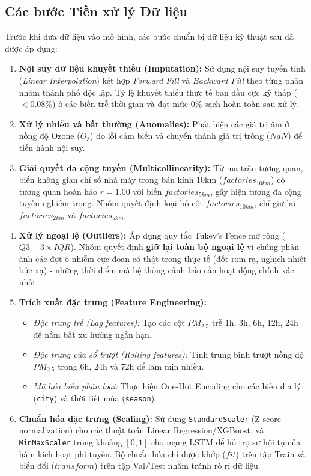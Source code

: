 \documentclass[12pt,a4paper]{article}
\begin{document}
\subsection{Các bước Tiền xử lý Dữ liệu}

Trước khi đưa dữ liệu vào mô hình, các bước chuẩn bị dữ liệu kỹ thuật sau đã được áp dụng:
\begin{enumerate}
    \item \textbf{Nội suy dữ liệu khuyết thiếu (Imputation):} Sử dụng nội suy tuyến tính (\textit{Linear Interpolation}) kết hợp \textit{Forward Fill} và \textit{Backward Fill} theo từng phân nhóm thành phố độc lập. Tỷ lệ khuyết thiếu thực tế ban đầu cực kỳ thấp ($<0.08\%$) ở các biến trễ thời gian và đạt mức $0\%$ sạch hoàn toàn sau xử lý.
    \item \textbf{Xử lý nhiễu và bất thường (Anomalies):} Phát hiện các giá trị âm ở nồng độ Ozone ($O_3$) do lỗi cảm biến và chuyển thành giá trị trống ($NaN$) để tiến hành nội suy.
    \item \textbf{Giải quyết đa cộng tuyến (Multicollinearity):} Từ ma trận tương quan, biến không gian chỉ số nhà máy trong bán kính 10km ($factories_{10km}$) có tương quan hoàn hảo $r=1.00$ với biến $factories_{5km}$, gây hiện tượng đa cộng tuyến nghiêm trọng. Nhóm quyết định loại bỏ cột $factories_{10km}$, chỉ giữ lại $factories_{2km}$ và $factories_{5km}$.
    \item \textbf{Xử lý ngoại lệ (Outliers):} Áp dụng quy tắc Tukey's Fence mở rộng ($Q3 + 3 \times IQR$). Nhóm quyết định \textbf{giữ lại toàn bộ ngoại lệ} vì chúng phản ánh các đợt ô nhiễm cực đoan có thật trong thực tế (đốt rơm rạ, nghịch nhiệt bức xạ) - những thời điểm mà hệ thống cảnh báo cần hoạt động chính xác nhất.
    \item \textbf{Trích xuất đặc trưng (Feature Engineering):}
    \begin{itemize}
        \item \textit{Đặc trưng trễ (Lag features):} Tạo các cột $PM_{2.5}$ trễ 1h, 3h, 6h, 12h, 24h để nắm bắt xu hướng ngắn hạn.
        \item \textit{Đặc trưng cửa sổ trượt (Rolling features):} Tính trung bình trượt nồng độ $PM_{2.5}$ trong 6h, 24h và 72h để làm mịn nhiễu.
        \item \textit{Mã hóa biến phân loại:} Thực hiện One-Hot Encoding cho các biến địa lý (\texttt{city}) và thời tiết mùa (\texttt{season}).
    \end{itemize}
    \item \textbf{Chuẩn hóa đặc trưng (Scaling):} Sử dụng \texttt{StandardScaler} (Z-score normalization) cho các thuật toán Linear Regression/XGBoost, và \texttt{MinMaxScaler} trong khoảng $[0, 1]$ cho mạng LSTM để hỗ trợ sự hội tụ của hàm kích hoạt phi tuyến. Bộ chuẩn hóa chỉ được khớp ($fit$) trên tập Train và biến đổi ($transform$) trên tập Val/Test nhằm tránh rò rỉ dữ liệu.
\end{enumerate}
\end{document}

